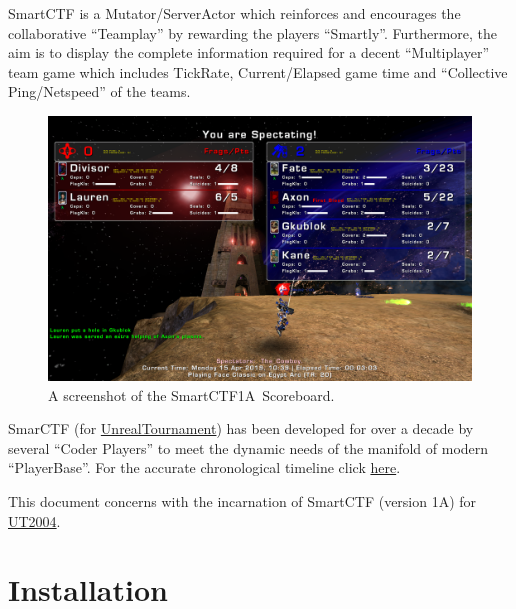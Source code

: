 \documentclass{article}
\newcommand{\SmartVersion}{1A}
\begin{document}
SmartCTF is a Mutator/ServerActor which reinforces and encourages the collaborative ``Teamplay'' by rewarding the players ``Smartly''.  Furthermore, the aim is to display the complete information required for a decent ``Multiplayer'' team game which includes TickRate, Current/Elapsed game time and ``Collective Ping/Netspeed'' of the teams.

\begin{figure}
\centering
\label{fig:smartscoreboard}
\includegraphics[width=1.1\textwidth]{img}
\caption{A screenshot of the SmartCTF\SmartVersion~Scoreboard.}
\end{figure}

SmarCTF (for \href{https://en.wikipedia.org/wiki/Unreal_Tournament}{\color{Blue}UnrealTournament}) has been developed for over a decade by several ``Coder Players'' to meet the dynamic needs of the manifold of modern ``PlayerBase''.  For the accurate chronological timeline click \href{http://wiki.unrealadmin.org/SmartCTF}{{\color{Blue}here}}.

This document concerns with the incarnation of SmartCTF (version \SmartVersion) for \href{https://en.wikipedia.org/wiki/Unreal_Tournament_2004}{{\color{Blue}UT2004}}. 

\section{Installation}
\end{document}
